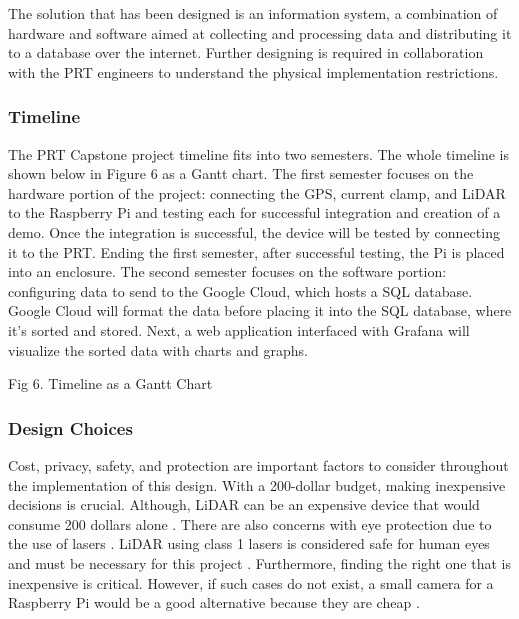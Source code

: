 The solution that has been designed is an information system, a combination of hardware and software aimed at collecting and processing data and distributing it to a database over the internet.
Further designing is required in collaboration with the PRT engineers to understand the physical implementation restrictions.

\subsubsection{Timeline}
The PRT Capstone project timeline fits into two semesters. 
The whole timeline is shown below in Figure 6 as a Gantt chart. 
The first semester focuses on the hardware portion of the project: connecting the GPS, current clamp, and LiDAR to the Raspberry Pi and testing each for successful integration and creation of a demo. 
Once the integration is successful, the device will be tested by connecting it to the PRT. 
Ending the first semester, after successful testing, the Pi is placed into an enclosure. 
The second semester focuses on the software portion: configuring data to send to the Google Cloud, which hosts a SQL database. 
Google Cloud will format the data before placing it into the SQL database, where it's sorted and stored. 
Next, a web application interfaced with Grafana will visualize the sorted data with charts and graphs.


\begin{center}
    Fig 6. Timeline as a Gantt Chart
\end{center}

\subsubsection{Design Choices}
Cost, privacy, safety, and protection are important factors to consider throughout the implementation of this design. 
With a 200-dollar budget, making inexpensive decisions is crucial. 
Although, LiDAR can be an expensive device that would consume 200 dollars alone \cite{linkedinEvaluateEnvironmental}. 
There are also concerns with eye protection due to the use of lasers \cite{linkedinEvaluateEnvironmental}. 
LiDAR using class 1 lasers is considered safe for human eyes and must be necessary for this project \cite{liaLaserHazard}. 
Furthermore, finding the right one that is inexpensive is critical. 
However, if such cases do not exist, a small camera for a Raspberry Pi would be a good alternative because they are cheap \cite{amazon}. 

